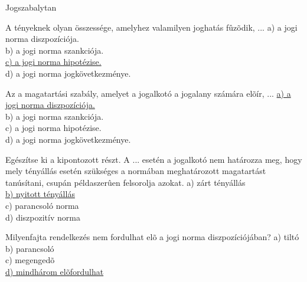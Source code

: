 \begin{frame}[plain]
\begin{tcolorbox}[center, colback={myyellow}, coltext={black}, colframe={myyellow}]
    { Jogszabalytan}\\
\end{tcolorbox}
\end{frame}

\begin{frame}  

\begin{tcolorbox}[title={18. Kérdés}]
A tényeknek olyan összessége, amelyhez valamilyen joghatás fûzõdik, ...
\tcblower
a) a jogi norma diszpozíciója.\\
b) a jogi norma szankciója.\\
\uline {c) a jogi norma hipotézise.}\\
d) a jogi norma jogkövetkezménye.
\end{tcolorbox}

\begin{tcolorbox}[title={19. Kérdés}]
Az a magatartási szabály, amelyet a jogalkotó a jogalany számára elõír, ...
\tcblower
\uline {a) a jogi norma diszpozíciója.}\\
b) a jogi norma szankciója.\\
c) a jogi norma hipotézise.\\
d) a jogi norma jogkövetkezménye.
\end{tcolorbox}

\begin{tcolorbox}[title={20. Kérdés}]
Egészítse ki a kipontozott részt.
A ... esetén a jogalkotó nem határozza meg, hogy mely tényállás esetén szükséges 
a normában meghatározott magatartást tanúsítani, csupán példaszerûen felsorolja azokat.
\tcblower
a) zárt tényállás\\
\uline {b) nyitott tényállás}\\
c) parancsoló norma\\
d) diszpozitív norma
\end{tcolorbox}

\begin{tcolorbox}[title={21. Kérdés}]
Milyenfajta rendelkezés nem fordulhat elõ a jogi norma diszpozíciójában?
\tcblower
a) tiltó\\
b) parancsoló\\
c) megengedõ\\
\uline {d) mindhárom elõfordulhat}
\end{tcolorbox}

\end{frame}


